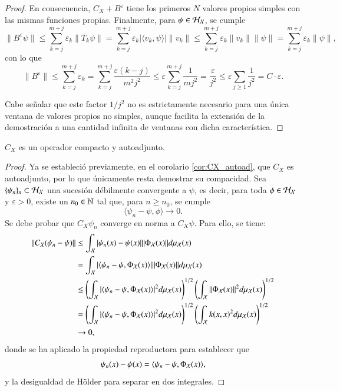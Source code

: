 \begin{proof}
    En consecuencia, $C_X + B^\varepsilon$ tiene los primeros $N$ valores propios simples con las mismas funciones propias. Finalmente, para $\psi \in \mathcal{H}_{\mathcal{X}}$, se cumple
    \[
    \| B^\varepsilon \psi \| \leq \sum_{k=j}^{m+j} \varepsilon_k \| T_k \psi \| = \sum_{k=j}^{m+j} \varepsilon_k | \langle v_k, \psi \rangle | \| v_k \| \leq \sum_{k=j}^{m+j} \varepsilon_k \| v_k \| \| \psi \| = \sum_{k=j}^{m+j} \varepsilon_k \| \psi \|,
    \]
    con lo que
    \[
    \| B^\varepsilon \| \leq \sum_{k=j}^{m+j} \varepsilon_k  = \sum_{k=j}^{m+j} \frac{\varepsilon (k-j)}{m^2 j^2} \leq \varepsilon \sum_{k=j}^{m+j} \frac{1}{m j^2} = \frac{\varepsilon}{j^2} \leq \varepsilon \sum_{j \geq 1} \frac{1}{j^2} = C \cdot \varepsilon.
    \]

    Cabe señalar que este factor $1/j^2$ no es estrictamente necesario para una única ventana de valores propios no simples, aunque facilita la extensión de la demostración a una cantidad infinita de ventanas con dicha característica.
\end{proof}

\begin{lema}
    $C_X$ es un operador compacto y autoadjunto.
\end{lema}

\begin{proof}
    Ya se estableció previamente, en el corolario \ref{cor:CX_autoad}, que $C_X$ es autoadjunto, por lo que únicamente resta demostrar su compacidad. Sea $\{ \psi_n \}_n \subset \mathcal{H}_{\mathcal{X}}$ una sucesión débilmente convergente a $\psi$, es decir, para toda $\phi \in \mathcal{H}_{\mathcal{X}}$ y $\varepsilon > 0$, existe un $n_0 \in \mathbb{N}$ tal que, para $n \geq n_0$, se cumple
    \[
    \langle \psi_n - \psi, \phi \rangle \to 0.
    \]
    Se debe probar que $C_X \psi_n$ converge en norma a $C_X \psi$. Para ello, se tiene:
    \[
    \begin{aligned}
        \| C_X (\psi_n - \psi) \| & \leq \int_{\mathcal{X}} | \psi_n (x) - \psi (x) | \| \Phi_{\mathcal{X}} (x) \| d \mu_{\mathcal{X}} (x) \\
        & = \int_{\mathcal{X}} | \langle \psi_n - \psi, \Phi_{\mathcal{X}} (x) \rangle | \| \Phi_{\mathcal{X}} (x) \| d \mu_{\mathcal{X}} (x) \\
        & \leq \left ( \int_{\mathcal{X}} | \langle \psi_n - \psi, \Phi_{\mathcal{X}} (x) \rangle |^2 d \mu_{\mathcal{X}} (x) \right )^{1/2} \left ( \int_{\mathcal{X}} \| \Phi_{\mathcal{X}} (x) \|^2 d \mu_{\mathcal{X}} (x) \right )^{1/2} \\
        & = \left ( \int_{\mathcal{X}} | \langle \psi_n - \psi, \Phi_{\mathcal{X}} (x) \rangle |^2 d \mu_{\mathcal{X}} (x) \right )^{1/2} \left ( \int_{\mathcal{X}} k(x,x)^2 d \mu_{\mathcal{X}} (x) \right )^{1/2} \\
        & \to 0,
    \end{aligned}
    \]
    donde se ha aplicado la propiedad reproductora para establecer que
    \[
    \psi_n (x) - \psi (x) = \langle \psi_n - \psi, \Phi_{\mathcal{X}} (x) \rangle,
    \]
    y la desigualdad de Hölder para separar en dos integrales.
\end{proof}


